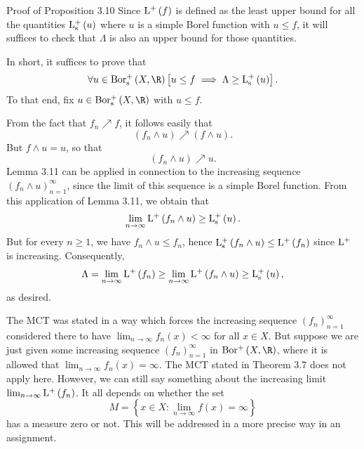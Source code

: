 \documentclass[pmath450]{subfiles}
\begin{document}
    \begin{boxyproof}{Proof of Proposition 3.10}
        Since $\operatorname{L^+}\left( f \right)$ is defined as the least upper bound for all the quantities $\operatorname{L^+_s}\left( u \right)$ where $u$ is a simple Borel function with $u\leq f$, it will suffices to check that $\Lambda$ is also an upper bound for those quantities.

        In short, it suffices to prove that
        \begin{equation*}
            \forall u\in\borpluss\left( X,\R \right)\left[ u\leq f\implies \Lambda\geq\lpluss\left( u \right) \right].
        \end{equation*}
        To that end, fix $u\in\borpluss\left( X,\R \right)$ with $u\leq f$.

        From the fact that $f_n\nearrow f$, it follows easily that
        \begin{equation*}
            \left( f_n\wedge u \right)\nearrow \left( f\wedge u \right).
        \end{equation*}
        But $f\wedge u = u$, so that
        \begin{equation*}
            \left( f_n\wedge u \right)\nearrow u.
        \end{equation*}
        Lemma 3.11 can be applied in connection to the increasing sequence $\left( f_{n}\wedge u \right)^{\infty}_{n=1}$, since the limit of this sequence is a simple Borel function. From this application of Lemma 3.11, we obtain that
        \begin{equation*}
            \lim_{n\to\infty}\operatorname{L^+}\left( f_n\wedge u \right)\geq \operatorname{L^+_s}\left( u \right).
        \end{equation*}
        But for every $n\geq 1$, we have $f_n\wedge u\leq f_n$, hence $\operatorname{L^+_s}\left( f_n\wedge u \right)\leq\operatorname{L^+}\left( f_n \right)$ since $\operatorname{L^+}$ is increasing. Consequently,
        \begin{equation*}
            \Lambda = \lim_{n\to\infty}\operatorname{L^+}\left( f_n \right) \geq \lim_{n\to\infty}\operatorname{L^+}\left( f_n\wedge u \right) \geq \operatorname{L^+_s}\left( u \right),
        \end{equation*}
        as desired.
    \end{boxyproof}

    \np The MCT was stated in a way which forces the increasing sequence $\left( f_{n} \right)^{\infty}_{n=1}$ considered there to have $\lim_{n\to\infty}f_n\left( x \right)<\infty$ for all $x\in X$. But suppose we are just given some increasing sequence $\left( f_{n} \right)^{\infty}_{n=1}$ in $\borplus\left( X,\R \right)$, where it is allowed that $\lim_{n\to\infty}f_n\left( x \right)=\infty$. The MCT stated in Theorem 3.7 does not apply here. However, we can still say something about the increasing limit $\lim_{n\to\infty}\operatorname{L^+}\left( f_n \right)$. It all depends on whether the set
    \begin{equation*}
        M = \left\lbrace x\in X: \lim_{n\to\infty}f\left( x \right)=\infty \right\rbrace
    \end{equation*}
    has a measure zero or not. This will be addressed in a more precise way in an assignment.
\end{document}
